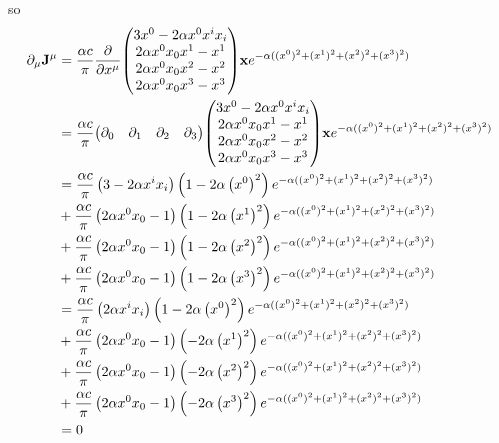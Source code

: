 so
\begin{align}
	\partial_\mu\bold J^\mu &= \frac{\alpha c}{\pi}\diffp*{}{x^\mu}\mqty(3x^0-2\alpha x^0x^ix_i\\2\alpha x^0x_0x^1-x^1\\2\alpha x^0x_0x^2-x^2\\2\alpha x^0x_0x^3-x^3)\bold x e^{-\alpha((x^0)^2+(x^1)^2+(x^2)^2+(x^3)^2)}\\
	&= \frac{\alpha c}{\pi}\mqty(\partial_0&\partial_1&\partial_2&\partial_3)\mqty(3x^0-2\alpha x^0x^ix_i\\2\alpha x^0x_0x^1-x^1\\2\alpha x^0x_0x^2-x^2\\2\alpha x^0x_0x^3-x^3)\bold x e^{-\alpha((x^0)^2+(x^1)^2+(x^2)^2+(x^3)^2)}\\
	&= \frac{\alpha c}{\pi}\ins{3-2\alpha x^ix_i}\ins{1-2\alpha \ins{x^0}^2}e^{-\alpha((x^0)^2+(x^1)^2+(x^2)^2+(x^3)^2)}\\
	&+\frac{\alpha c}{\pi}\ins{2\alpha x^0x_0-1}\ins{1-2\alpha \ins{x^1}^2}e^{-\alpha((x^0)^2+(x^1)^2+(x^2)^2+(x^3)^2)}\\
	&+\frac{\alpha c}{\pi}\ins{2\alpha x^0x_0-1}\ins{1-2\alpha \ins{x^2}^2}e^{-\alpha((x^0)^2+(x^1)^2+(x^2)^2+(x^3)^2)}\\
	&+\frac{\alpha c}{\pi}\ins{2\alpha x^0x_0-1}\ins{1-2\alpha \ins{x^3}^2}e^{-\alpha((x^0)^2+(x^1)^2+(x^2)^2+(x^3)^2)}\\
  &= \frac{\alpha c}{\pi}\ins{2\alpha x^ix_i}\ins{1-2\alpha \ins{x^0}^2}e^{-\alpha((x^0)^2+(x^1)^2+(x^2)^2+(x^3)^2)}\\
	&+\frac{\alpha c}{\pi}\ins{2\alpha x^0x_0-1}\ins{-2\alpha \ins{x^1}^2}e^{-\alpha((x^0)^2+(x^1)^2+(x^2)^2+(x^3)^2)}\\
	&+\frac{\alpha c}{\pi}\ins{2\alpha x^0x_0-1}\ins{-2\alpha \ins{x^2}^2}e^{-\alpha((x^0)^2+(x^1)^2+(x^2)^2+(x^3)^2)}\\
	&+\frac{\alpha c}{\pi}\ins{2\alpha x^0x_0-1}\ins{-2\alpha \ins{x^3}^2}e^{-\alpha((x^0)^2+(x^1)^2+(x^2)^2+(x^3)^2)}\\
	&= 0
\end{align}
